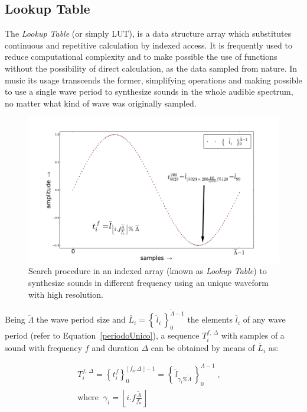 \documentclass[
 aip,
 jmp,
 amsmath,amssymb,
 reprint,
]{revtex4-1}
\begin{document}
\subsection{Lookup Table}\label{subsec:lookup}

The \emph{Lookup Table} (or simply LUT), is a data structure array which substitutes continuous and repetitive calculation by indexed access. It is frequently used to reduce computational complexity and to make possible the use of functions without the possibility of direct calculation, as the data sampled from nature.
In music its usage transcends the former, simplifying operations and making possible to use a single wave period to synthesize sounds in the whole audible spectrum, no matter what kind of wave was originally sampled.

\begin{figure}[h!]
    \centering
        \includegraphics[width=\columnwidth]{figures/lut}
    \caption{Search procedure in an indexed array (known as \emph{Lookup Table}) to synthesize sounds in different frequency using an unique waveform with high resolution.}
        \label{fig:lut}                                                                                                            
\end{figure}

Being $\widetilde{\Lambda}$ the wave period size and $\widetilde{L_i} = \left\{\, \widetilde{l}_i \,\right\}_0^{\widetilde{\Lambda} -1}$ the elements $\widetilde{l_i}$ of any wave period (refer to Equation~\ref{periodoUnico}), a sequence $T_i^{f,\,\Delta}$ with samples of a sound with frequency $f$ and duration $\Delta$ can be obtained by means of $\widetilde{L_i}$ as:

\begin{multline}\label{eq:lut}
T_i^{f,\,\Delta}=\left\{t_i^f\right\}_0^{\lfloor \, f_a . \Delta \, \rfloor -1} = \left\{ \, \widetilde{l}_{\gamma_i \% \widetilde{\Lambda} }\, \right\}_{0}^{\Lambda-1}\; , \quad \\ \text{where} \;\; \gamma_i = \left \lfloor i . f \frac{ \widetilde{\Lambda}}{f_a} \right \rfloor  
\end{multline}
\end{document}
